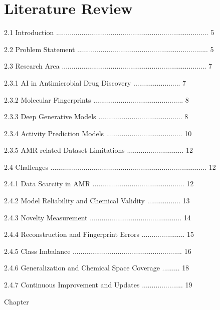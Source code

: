 \chapter{Literature Review}
2.1 Introduction .............................................................................. 5 

2.2 Problem Statement ................................................................... 5 

2.3 Research Area .......................................................................... 7 

2.3.1 AI in Antimicrobial Drug Discovery ........................ 7 

2.3.2 Molecular Fingerprints .............................................. 8 

2.3.3 Deep Generative Models ........................................... 8 

2.3.4 Activity Prediction Models ....................................... 10 

2.3.5 AMR-related Dataset Limitations ............................. 12 

2.4 Challenges ................................................................................ 12 

2.4.1 Data Scarcity in AMR ............................................... 12 

2.4.2 Model Reliability and Chemical Validity ................. 13 

2.4.3 Novelty Measurement ............................................... 14 

2.4.4 Reconstruction and Fingerprint Errors ...................... 15 

2.4.5 Class Imbalance ........................................................ 16 

2.4.6 Generalization and Chemical Space Coverage ......... 18 

2.4.7 Continuous Improvement and Updates ..................... 19 

Chapter